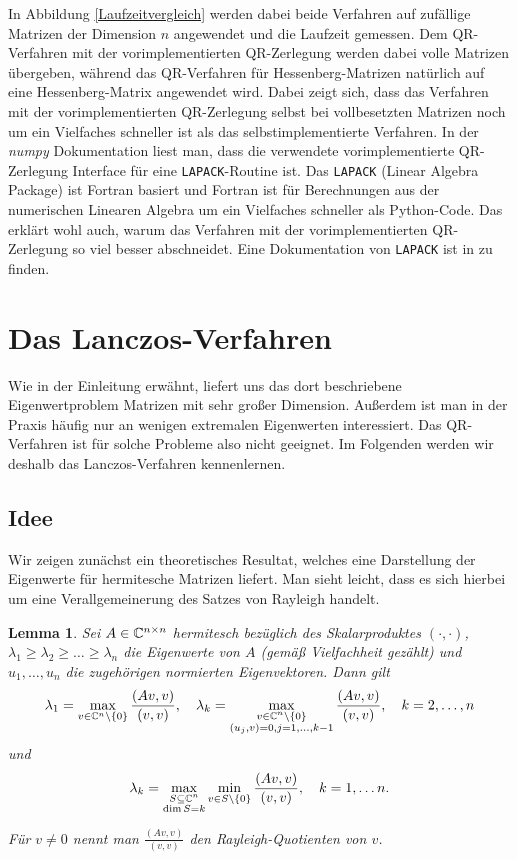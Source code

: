 \documentclass{article}
\theoremstyle{plain}
\newtheorem{lemma}      [theorem]{Lemma}
\begin{document}
In Abbildung \ref{Laufzeitvergleich} werden dabei beide Verfahren auf zufällige Matrizen der Dimension $n$ angewendet und die Laufzeit gemessen. Dem QR-Verfahren mit der vorimplementierten QR-Zerlegung werden dabei volle Matrizen übergeben, während das QR-Verfahren für Hessenberg-Matrizen natürlich auf eine Hessenberg-Matrix angewendet wird. Dabei zeigt sich, dass das Verfahren mit der vorimplementierten QR-Zerlegung selbst bei vollbesetzten Matrizen noch um ein Vielfaches schneller ist als das selbstimplementierte Verfahren. In der \textit{numpy} Dokumentation liest man, dass die verwendete vorimplementierte QR-Zerlegung Interface für eine \texttt{LAPACK}-Routine ist. Das \texttt{LAPACK} (Linear Algebra Package) ist Fortran basiert und Fortran ist für Berechnungen aus der numerischen Linearen Algebra um ein Vielfaches schneller als Python-Code. Das erklärt wohl auch, warum das Verfahren mit der vorimplementierten QR-Zerlegung so viel besser abschneidet. Eine Dokumentation von \texttt{LAPACK} ist in \cite{LAPACK} zu finden.

\section{Das Lanczos-Verfahren}
Wie in der Einleitung erwähnt, liefert uns das dort beschriebene Eigenwertproblem Matrizen mit sehr großer Dimension. Außerdem ist man in der Praxis häufig nur an wenigen extremalen Eigenwerten interessiert. Das QR-Verfahren ist für solche Probleme also nicht geeignet. Im Folgenden werden wir deshalb das Lanczos-Verfahren kennenlernen.

\subsection{Idee}

Wir zeigen zunächst ein theoretisches Resultat, welches eine Darstellung der Eigenwerte für hermitesche Matrizen liefert. Man sieht leicht, dass es sich hierbei um eine Verallgemeinerung des Satzes von Rayleigh handelt.

\begin{lemma} \label{Rayleigh}
	Sei $A \in \mathbb{C}^{n \times n}$ hermitesch bezüglich des Skalarproduktes $(\cdot, \cdot)$, $\lambda_1 \geq \lambda_2 \geq \dots \geq \lambda_n$ die Eigenwerte von $A$ (gemäß Vielfachheit gezählt) und $u_1, \dots, u_n$ die zugehörigen normierten Eigenvektoren. Dann gilt
	\begin{align}\label{lambdamax}
		\lambda_1 = \max_{v \in \mathbb{C}^n \setminus \{0\}} \frac{(Av,v)}{(v,v)}, \quad \lambda_k = \max_{\substack{v \in \mathbb{C}^n \setminus \{0\}\\
    (u_j,v) = 0, j= 1,\dots, k-1}} \frac{(Av,v)}{(v,v)}, \quad k= 2, \dots, n
	\end{align}
	und
	\begin{align}\label{lambdamaxmin}
		\lambda_k = \max_{\substack{S \subseteq \mathbb{C}^n\\
    \dim S = k}} \min_{v \in S \setminus \{0\}} \frac{(Av,v)}{(v,v)}, \quad k=1, \dots n.
	\end{align}

	Für $v \neq 0$ nennt man $\frac{(Av,v)}{(v,v)}$ den Rayleigh-Quotienten von $v$.
\end{lemma}
\end{document}
